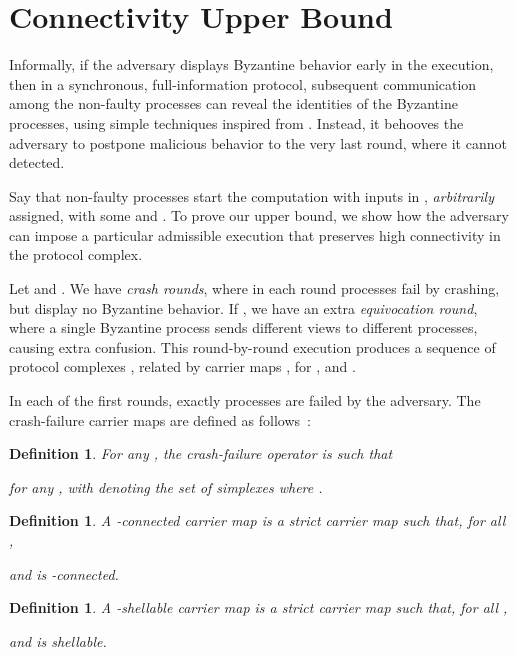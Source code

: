 \documentclass[11pt]{article}
\newtheorem{definition}[theorem]{Definition}
\begin{document}
\section{Connectivity Upper Bound}
\label{Sec-ConnectivityUpperBound}
Informally, if the adversary displays Byzantine behavior early in the execution,
then in a synchronous, full-information protocol,
subsequent communication among the non-faulty processes can reveal
the identities of the Byzantine processes,
using simple techniques inspired from \cite{BazziNeiger01,Bracha,SriTouRB}.
Instead, it behooves the adversary to postpone malicious behavior to
the very last round, where it cannot detected.

Say that non-faulty processes start the computation with inputs in ,
\emph{arbitrarily} assigned,
with some  and .
To prove our upper bound,
we show how the adversary can impose a particular admissible execution
that preserves high connectivity in the protocol complex.

Let  and .
We have  \emph{crash rounds},
where in each round  processes fail by crashing, but display no Byzantine behavior.
If ,
we have an extra \emph{equivocation round},
where a single Byzantine process
sends different views to different processes,
causing extra confusion.
This round-by-round execution produces a sequence of protocol complexes
,
related by carrier maps
,
for ,
and .




In each of the first  rounds,
exactly  processes are failed by the adversary.
The crash-failure carrier maps are defined
as follows~\cite{ConcurrentShellable,MauriceBook}:

\begin{definition}
\label{definition-roundop-crash}
For any ,
the crash-failure operator  is such that

for any ,
with  denoting the set of simplexes  where .
\end{definition}

\begin{definition}
\label{definition-mapconnected}
A \emph{-connected} carrier map  is
a strict carrier map such that, for all ,

and
 is -connected.
\end{definition}

\begin{definition}
\label{definition-mapshellable}
A \emph{-shellable} carrier map  is
a strict carrier map such that, for all ,

and
 is shellable.
\end{definition}
\end{document}
